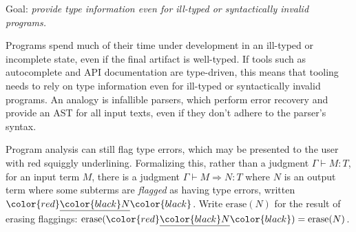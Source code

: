 \documentclass[acmsmall]{acmart}
\newcommand{\squnder}[1]{\color{red}\underline{{\color{black}#1}}\color{black}}
\newcommand{\erase}{\mathrm{erase}}
\begin{document}
Goal: \emph{provide type information even for ill-typed or syntactically invalid programs.}

Programs spend much of their time under development in an ill-typed or incomplete state, even if the
final artifact is well-typed. If tools such as autocomplete and API documentation are type-driven,
this means that tooling needs to rely on type information even for ill-typed
or syntactically invalid programs. An analogy is infallible parsers, which perform error recovery and
provide an AST for all input texts, even if they don't adhere to the parser's syntax.

Program analysis can still flag type errors, which may be presented
to the user with red squiggly underlining. Formalizing this, rather
than a judgment
$\Gamma\vdash M:T$, for an input term $M$, there is a judgment
$\Gamma \vdash M \Rightarrow N : T$ where $N$ is an output term
where some subterms are \emph{flagged} as having type errors, written $\squnder{N}$. Write $\erase(N)$
for the result of erasing flaggings: $\erase(\squnder{N}) = \erase(N)$.
\end{document}
